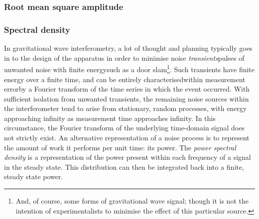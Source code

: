 

\subsubsection{Root mean square amplitude}

\subsubsection{Spectral density}
In gravitational wave interferometry, a lot of thought and planning typically goes in to the design of the apparatus in order to minimise noise \emph{transients}\textemdash pulses of unwanted noise with finite energy\textemdash such as a door slam\footnote{And, of course, some forms of gravitational wave signal; though it is not the intention of experimentalists to minimise the effect of this particular source.}. Such transients have finite energy over a finite time, and can be entirely characterised\textemdash within measurement error\textemdash by a Fourier transform of the time series in which the event occurred. With sufficient isolation from unwanted transients, the remaining noise sources within the interferometer tend to arise from stationary, random processes, with energy approaching infinity as measurement time approaches infinity. In this circumstance, the Fourier transform of the underlying time-domain signal does not strictly exist. An alternative representation of a noise process is to represent the amount of work it performs per unit time: its power. The \emph{power spectral density} is a representation of the power present within each frequency of a signal in the steady state. This distribution can then be integrated back into a finite, steady state power.

